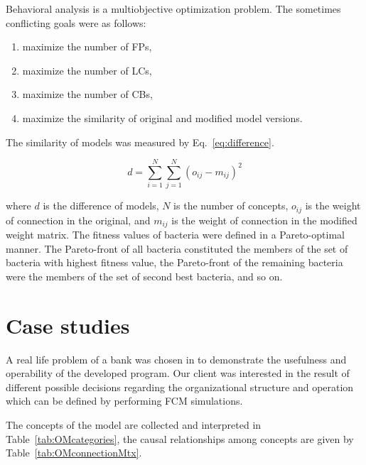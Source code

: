 \documentclass[graybox]{svmult}
\begin{document}
Behavioral analysis is a multiobjective optimization problem. The 
sometimes conflicting goals were as follows:
\begin{enumerate}
  \item maximize the number of FPs,
  \item maximize the number of LCs,
  \item maximize the number of CBs,
  \item maximize the similarity of original and modified model 
  versions.
\end{enumerate}

\noindent The similarity of models was measured by Eq.~\ref{eq:difference}.

\begin{equation}
  \label{eq:difference}
  d = \sum_{i=1}^{N} \sum_{j=1}^{N} (o_{ij} - m_{ij})^2
\end{equation}

\noindent where $d$ is the difference of models, $N$ is the number of 
concepts, $o_{ij}$ is the weight of connection in the original, and 
$m_{ij}$ is the weight of connection in the modified weight matrix. 
The fitness values of bacteria were defined in a Pareto-optimal 
manner. The Pareto-front of all bacteria constituted the members of the 
set of bacteria with highest fitness value, the Pareto-front of the 
remaining bacteria were the members of the set of second best bacteria, 
and so on.

\section{Case studies}
\label{sec:banking}

A real life problem of a bank was chosen in \cite
{hatwagner2018improved,hatwagner2019banking} to demonstrate the 
usefulness and operability of the developed program. Our client was interested in the result of different possible decisions regarding the organizational structure and operation which can be defined by performing FCM simulations. 

The concepts of the model are collected and interpreted in Table~\ref{tab:OMcategories}, the causal relationships among concepts are given by Table~\ref{tab:OMconnectionMtx}. 
\end{document}
